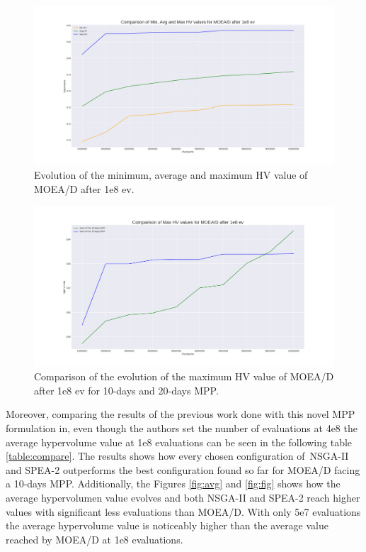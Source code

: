 \begin{figure}[H]
\centering
\includegraphics[scale=0.35]{../experiments/plots/minHV_avgHV_maxHV_evolution_10_days.png}
\caption{Evolution of the minimum, average and maximum HV value of MOEA/D after 1e8 ev.}
\label{fig:average}
\end{figure}

\begin{figure}[H]
\centering
\includegraphics[scale=0.35]{../experiments/plots/maxHV_evolution_10_vs_20_days.png}
\caption{Comparison of the evolution of the maximum HV value of MOEA/D after 1e8 ev for 10-days and 20-days MPP.}
\label{fig:comare}
\end{figure}

Moreover, comparing the results of the previous work done with this novel MPP formulation in\cite{Miranda2018}, even though the authors set the number of evaluations at 4e8 the average hypervolume value at 1e8 evaluations can be seen in the following table \ref{table:compare}. The results shows how every chosen configuration of~NSGA-II and SPEA-2 outperforms the best configuration found so far for MOEA/D facing a 10-days MPP. Additionally, the Figures \ref{fig:avg} and \ref{fig:fig} shows how the average hypervolumen value evolves and both NSGA-II and SPEA-2 reach higher values with significant less evaluations than MOEA/D. With only 5e7 evaluations the average hypervolume value is noticeably higher than the average value reached by MOEA/D at 1e8 evaluations.


